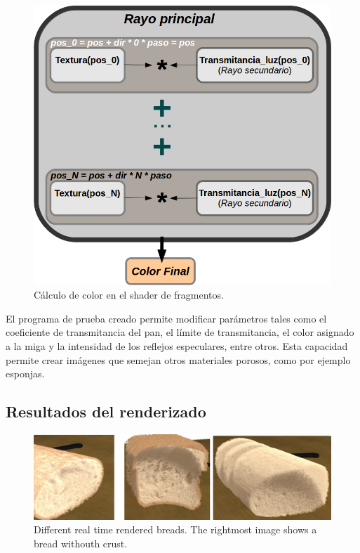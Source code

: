 \begin{figure}[htb!]
  \centerline{\includegraphics[width=13cm]{fragmentshader}}
  \caption{Cálculo de color en el shader de fragmentos. }
  \label{fg:fragmentshader}
\end{figure}


El programa de prueba creado permite modificar parámetros tales como el coeficiente de transmitancia del pan, el límite de transmitancia, el color asignado a la miga y la intensidad de los reflejos especulares, entre otros. Esta capacidad permite crear imágenes que semejan otros
materiales porosos, como por ejemplo esponjas.

\subsection{Resultados del renderizado}

\begin{figure}[htb!]
  \centerline{\includegraphics[width=13cm]{fig5}}
  \caption{Different real time rendered breads. The rightmost image shows a bread withouth crust.}
  \label{fg:fig5}
\end{figure}

